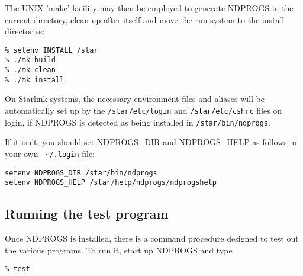 The UNIX 'make' facility may then be employed to generate NDPROGS in the
current directory, clean up after itself and move the run system to the
install directories:
 
\begin{myquote}
\begin{verbatim}
% setenv INSTALL /star
% ./mk build
% ./mk clean
% ./mk install
\end{verbatim}
\end{myquote}
 
On Starlink systems, the necessary environment files and aliases will
be automatically set up by the {\tt /star/etc/login} and {\tt /star/etc/cshrc}
files on login, if NDPROGS is detected as being installed in 
{\tt /star/bin/ndprogs}.
 
If it isn't, you should set NDPROGS\_DIR and NDPROGS\_HELP as follows in your own 
{\verb+ ~/.login+} file:
 
\begin{myquote}
\begin{verbatim}
setenv NDPROGS_DIR /star/bin/ndprogs
setenv NDPROGS_HELP /star/help/ndprogs/ndprogshelp
\end{verbatim}
\end{myquote}


\subsection{Running the test program}

Once NDPROGS is installed, there is a command procedure designed to test
out the various programs. To run it, start up NDPROGS and type

\begin{myquote}
\begin{verbatim}
% test
\end{verbatim}
\end{myquote}

